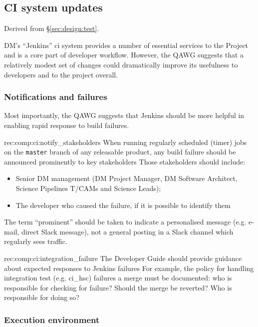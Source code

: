 \subsection{CI system updates}
\label{sec:comp:ci}

Derived from \S\ref{sec:design:test}.

DM's ``Jenkins'' \gls{ci} system provides a number of essential services to the Project and is a core part of developer workflow.
However, the QAWG suggests that a relatively modest set of changes could dramatically improve its usefulness to developers and to the project overall.

\subsubsection{Notifications and failures}

Most importantly, the QAWG suggests that Jenkins should be more helpful in enabling rapid response to build failures.

\begin{recommendation}
    {rec:comp:ci:notify_stakeholders}
    {When running regularly scheduled (timer) jobs on the \texttt{master} branch of any releasable product, any build failure should be announced prominently to key stakeholders}
Those stakeholders should include:
\begin{itemize}
  \item{Senior DM management (DM Project Manager, DM Software Architect, Science Pipelines T/CAMs and Science Leads);}
  \item{The developer who caused the failure, if it is possible to identify them}
\end{itemize}
The term ``prominent'' should be taken to indicate a personalised message (e.g. e-mail, direct Slack message), not a general posting in a Slack channel which regularly sees traffic.
\end{recommendation}

\begin{recommendation}
    {rec:comp:ci:integration_failure}
    {The Developer Guide should provide guidance about expected responses to Jenkins failures}
For example, the policy for handling integration test (e.g. ci\_hsc) failures a merge must be documented: who is responsible for checking for failure? Should the merge be reverted? Who is responsible for doing so?
\end{recommendation}

\subsubsection{Execution environment}

